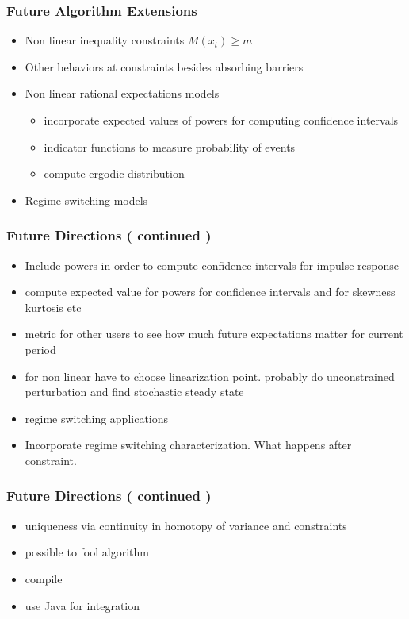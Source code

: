\documentclass{beamer}
\begin{document}
   \begin{frame}
     \frametitle{Future Algorithm Extensions}
     \begin{itemize}
     \item  Non linear inequality constraints $M(x_t) \ge m $
     \item Other behaviors at constraints besides absorbing barriers
\item Non linear rational expectations models
  \begin{itemize}
\item incorporate expected values of powers for computing confidence intervals 
\item indicator functions to measure probability of events
\item compute ergodic distribution
  \end{itemize}
\item Regime switching models
     \end{itemize}
   \end{frame}

    \begin{frame}
      \frametitle{Future Directions ( continued )}
      \begin{itemize}
 \item Include  powers in order to compute confidence intervals for impulse response
 \item compute expected value for powers for confidence intervals and for skewness kurtosis etc
 \item metric for other users to see how much future expectations matter for current period
   \item for non linear have to choose linearization point.  probably do unconstrained perturbation and find stochastic steady state
 \item regime switching applications
      \item Incorporate regime switching characterization.  What happens after constraint.
      \end{itemize}
    \end{frame}

   \begin{frame}
     \frametitle{Future Directions ( continued )}
     \begin{itemize}
 \item uniqueness via continuity in homotopy of variance and constraints
 \item possible to fool algorithm
 \item compile
 \item  use Java for integration
     \end{itemize}
   \end{frame}
\end{document}

